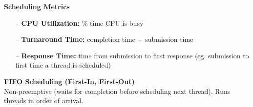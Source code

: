 \documentclass[8pt]{extarticle}
\begin{document}
\begin{minipage}[t]{0.5\textwidth}
        \noindent\textbf{Scheduling Metrics}
        \begin{itemize}[noitemsep,topsep=0pt]
            \item[–] \textbf{CPU Utilization:} \% time CPU is busy
            \item[–] \textbf{Turnaround Time:} completion time $-$ submission time
            \item[–] \textbf{Response Time:} time from submission to first response (eg. submission to first time a thread is scheduled)
        \end{itemize}
        \begin{minipage}[t]{0.48\textwidth}
        \noindent\textbf{FIFO Scheduling (First-In, First-Out)} \\
        Non-preemptive (waits for completion before scheduling next thread). Runs threads in order of arrival.


\end{minipage}
\end{minipage}
\end{document}
